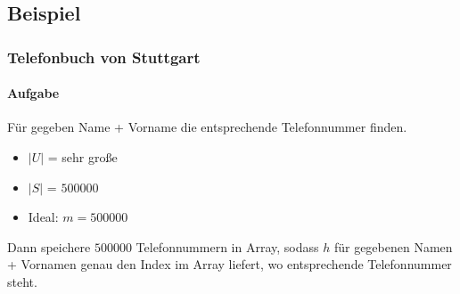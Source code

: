 \subsection{Beispiel}
\subsubsection*{Telefonbuch von Stuttgart}
\paragraph*{Aufgabe} Für gegeben Name + Vorname die entsprechende Telefonnummer finden.
\begin{itemize}
	\item $|U|$ = sehr große
	\item $|S|$ = $500 000$
	\item Ideal: $m = 500 000$
\end{itemize}
Dann speichere $500 000$ Telefonnummern in Array, sodass $h$ für gegebenen Namen + Vornamen genau den Index im Array liefert, wo entsprechende Telefonnummer steht.


